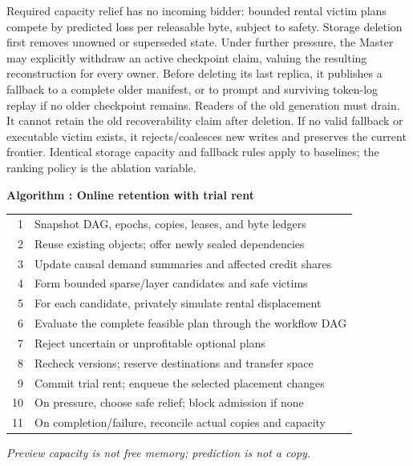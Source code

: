 Required capacity relief has no incoming bidder: bounded rental victim
plans compete by predicted loss per releasable byte, subject to safety.
Storage deletion first removes unowned or superseded state. Under further
pressure, the Master may explicitly withdraw an active checkpoint claim,
valuing the resulting reconstruction for every owner. Before deleting its
last replica, it publishes a fallback to a complete older manifest, or to
prompt and surviving token-log replay if no older checkpoint remains.
Readers of the old generation must drain. It cannot retain the old
recoverability claim after deletion. If no valid fallback or executable
victim exists, it rejects/coalesces new writes and preserves the current
frontier. Identical storage capacity and fallback rules apply to baselines;
the ranking policy is the ablation variable.

\par\medskip\noindent\begin{minipage}{\columnwidth}
\raggedright
 \label{alg:placement}
 \textbf{Algorithm \thedesignalgorithm: Online retention with trial rent}
 \par\smallskip
 \begin{tabularx}{\columnwidth}{@{}r@{\quad}X@{}}
 \toprule
 1 & Snapshot DAG, epochs, copies, leases, and byte ledgers \\
 2 & Reuse existing objects; offer newly sealed dependencies \\
 3 & Update causal demand summaries and affected credit shares \\
 4 & Form bounded sparse/layer candidates and safe victims \\
 5 & For each candidate, privately simulate rental displacement \\
 6 & Evaluate the complete feasible plan through the workflow DAG \\
 7 & Reject uncertain or unprofitable optional plans \\
 8 & Recheck versions; reserve destinations and transfer space \\
 9 & Commit trial rent; enqueue the selected placement changes \\
 10 & On pressure, choose safe relief; block admission if none \\
 11 & On completion/failure, reconcile actual copies and capacity \\
 \bottomrule
 \end{tabularx}
 \par\smallskip\noindent\textit{Preview capacity is not free memory; prediction is not a copy.}
 \end{minipage}\par\medskip

